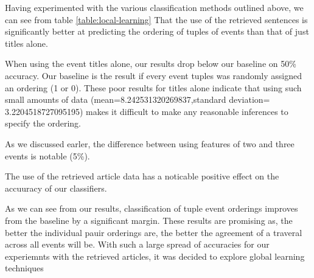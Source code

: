 \documentclass[bsc,frontabs,twoside,singlespacing,parskip,deptreport]{infthesis}     %
\begin{document}
Having experimented with the various classification methods outlined above, we can see from table \ref{table:local-learning}
That the use of the retrieved sentences is significantly better at predicting the ordering of tuples of events than that of
just titles alone.

When using the event titles alone, our results drop below our baseline on 50\% accuracy.
Our baseline is the result if every event tuples was randomly assigned an ordering (1 or 0).
These poor results for titles alone indicate that using such small amounts of data
(mean=8.242531320269837,standard deviation= 3.2204518727095195) makes it difficult to make any reasonable inferences to specify the ordering.


As we discussed earler, the difference between using features of two and three events is notable (5\%).

The use of the retrieved article data has a noticable positive effect on the accuuracy of our classifiers.



As we can see from our results, classification of tuple event orderings improves from the baseline by a significant margin.
These results are promising as, the better the individual pauir orderings are, the better the agreement of a traveral across all events will be.
With such a large spread of accuracies for our experiemnts with the retrieved articles, it was decided to explore global learning techniques




\end{document}
